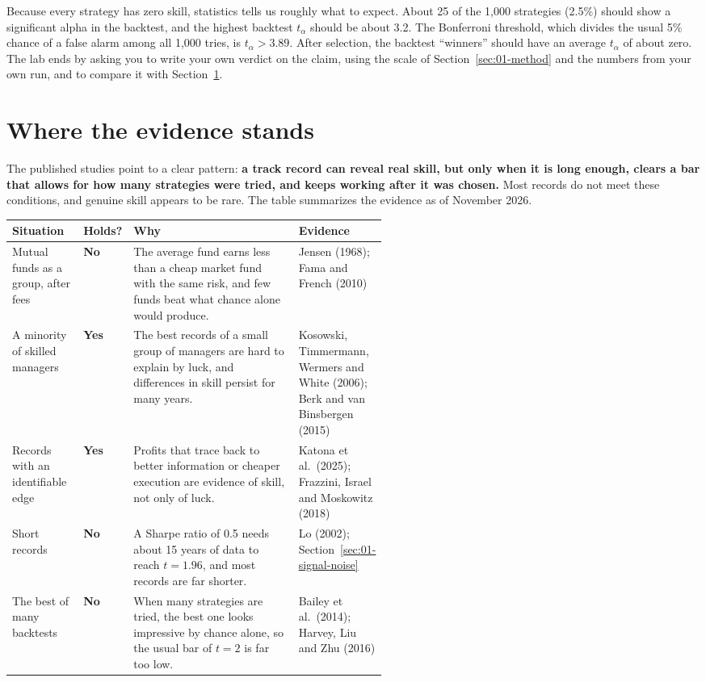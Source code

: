 Because every strategy has zero skill, statistics tells us roughly what to expect. About 25 of the 1,000 strategies (2.5\%) should show a significant alpha in the backtest, and the highest backtest $t_\alpha$ should be about 3.2. The Bonferroni threshold, which divides the usual 5\% chance of a false alarm among all 1,000 tries, is $t_\alpha > 3.89$. After selection, the backtest ``winners'' should have an average $t_\alpha$ of about zero. The lab ends by asking you to write your own verdict on the claim, using the scale of Section~\ref{sec:01-method} and the numbers from your own run, and to compare it with Section~\ref{sec:01-verdict}.

\section{Where the evidence stands}
\label{sec:01-verdict}

The published studies point to a clear pattern: \textbf{a track record can reveal real skill, but only when it is long enough, clears a bar that allows for how many strategies were tried, and keeps working after it was chosen.} Most records do not meet these conditions, and genuine skill appears to be rare. The table summarizes the evidence as of November 2026.

\begin{center}
\small
\begin{tabularx}{\linewidth}{@{}>{\raggedright\arraybackslash}p{0.19\linewidth}>{\raggedright\arraybackslash}p{0.13\linewidth}>{\raggedright\arraybackslash}X>{\raggedright\arraybackslash}p{0.22\linewidth}@{}}
\toprule
Situation & Holds? & Why & Evidence \\
\midrule
Mutual funds as a group, after fees & \textbf{No} & The average fund earns less than a cheap market fund with the same risk, and few funds beat what chance alone would produce. & Jensen (1968); Fama and French (2010) \\
A minority of skilled managers & \textbf{Yes} & The best records of a small group of managers are hard to explain by luck, and differences in skill persist for many years. & Kosowski, Timmermann, Wermers and White (2006); Berk and van Binsbergen (2015) \\
Records with an identifiable edge & \textbf{Yes} & Profits that trace back to better information or cheaper execution are evidence of skill, not only of luck. & Katona et al.\ (2025); Frazzini, Israel and Moskowitz (2018) \\
Short records & \textbf{No} & A Sharpe ratio of 0.5 needs about 15 years of data to reach $t = 1.96$, and most records are far shorter. & Lo (2002); Section~\ref{sec:01-signal-noise} \\
The best of many backtests & \textbf{No} & When many strategies are tried, the best one looks impressive by chance alone, so the usual bar of $t = 2$ is far too low. & Bailey et al.\ (2014); Harvey, Liu and Zhu (2016) \\
\bottomrule
\end{tabularx}
\end{center}

